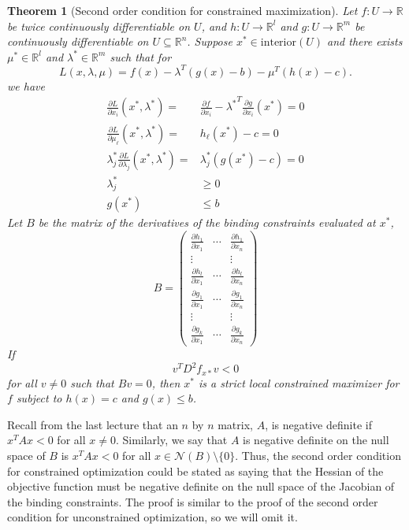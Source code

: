 \documentclass[12pt,reqno]{amsart}
\newtheorem{theorem}{Theorem}[section]
\theoremstyle{definition}
\def\R{\mathbb{R}}
\renewcommand{\to}{{\rightarrow}}
\begin{document}
\begin{theorem}[Second order condition for constrained maximization]
  Let $f:U \to \R$ be twice continuously
  differentiable on $U$, and $h:U \to \R^l$ and $g: U \to \R^m$ be
  continuously differentiable on $U \subseteq \R^n$. Suppose $x^* \in    
  \mathrm{interior}(U)$ and there exists
  $\mu^* \in \R^l$ and $\lambda^* \in \R^m$ such that for 
  \[ L(x,\lambda,\mu) = f(x) - \lambda^T (g(x) - b) - \mu^T(h(x) - c). \]
  we have
  \begin{align*}
    \frac{\partial L}{\partial x_i}(x^*,\lambda^*) = & \frac{\partial
      f}{\partial x_i} - {\lambda^*}^T \frac{\partial g}{\partial
      x_i}(x^*) = 0 \\
    \frac{\partial L}{\partial \mu_\ell}(x^*,\lambda^*) = & h_\ell(x^*) - c = 0 \\
    \lambda_j^* \frac{\partial L}{\partial \lambda_j}(x^*,\lambda^*) =
    & \lambda_j^* \left(g(x^*) - c \right)= 0 \\
    \lambda_j^* & \geq 0 \\
    g(x^*) & \leq b
  \end{align*}
  Let $B$ be the matrix of the derivatives of the binding constraints
  evaluated at $x^*$,
  \[ B = \begin{pmatrix} 
    \frac{\partial h_1}{\partial x_1} &  \cdots &\frac{\partial
      h_1}{\partial x_n}  \\
    \vdots & & \vdots \\
    \frac{\partial h_l}{\partial x_1} &  \cdots &\frac{\partial
      h_l}{\partial x_n}  \\    
    \frac{\partial g_1}{\partial x_1} &  \cdots &\frac{\partial
      g_1}{\partial x_n}  \\ 
    \vdots & & \vdots \\
    \frac{\partial g_k}{\partial x_1} &  \cdots &\frac{\partial
      g_k}{\partial x_n}  
  \end{pmatrix}
  \]
  If 
  \[ v^T D^2 f_{x*} v < 0 \]
  for all $v \neq 0$ such that $B v = 0$, then $x^*$ is a strict
  local constrained maximizer for $f$ subject to $h(x) = c$ and $g(x)
  \leq b$. 
\end{theorem}
Recall from the last lecture that an $n$ by $n$ matrix, $A$, is
negative definite if $x^T A x < 0$ for all $x \neq 0$. Similarly, we
say that $A$ is negative definite on the null space of $B$ is $x^T A x
< 0$ for all $x \in \mathcal{N}(B) \setminus\{0\}$. Thus, the second
order condition for constrained optimization could be stated as saying
that the Hessian of the objective function must be negative definite
on the null space of the Jacobian of the binding constraints. The
proof is similar to the proof of the second order condition for
unconstrained optimization, so we will omit it. 
\end{document}

